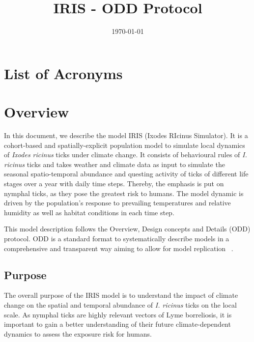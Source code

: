 \documentclass[a4paper, 11pt]{scrartcl}
\title{IRIS - ODD Protocol}
\author{}
\date{\today}
\begin{document}
\maketitle
\tableofcontents

\newpage
\listoffigures
\listoftables

\section*{List of Acronyms}
\begin{acronym}
\end{acronym}


\newpage
\section{Overview}
In this document, we describe the model IRIS (Ixodes RIcinus Simulator). It is a cohort-based and spatially-explicit population model to simulate local dynamics of \textit{Ixodes ricinus} ticks under climate change. It consists of behavioural rules of \textit{I. ricinus} ticks and takes weather and climate data as input to simulate the seasonal spatio-temporal abundance and questing activity of ticks of different life stages over a year with daily time steps. Thereby, the emphasis is put on nymphal ticks, as they pose the greatest risk to humans. The model dynamic is driven by the population's response to prevailing temperatures and relative humidity as well as habitat conditions in each time step.

This model description follows the Overview, Design concepts and Details (ODD) protocol. ODD is a standard format to systematically describe models in a comprehensive and transparent way aiming to allow for model replication ~\parencite{Grimm.2010, Grimm.2020}.


\subsection{Purpose}
The overall purpose of the IRIS model is to understand the impact of climate change on the spatial and temporal abundance of \textit{I. ricinus} ticks on the local scale. As nymphal ticks are highly relevant vectors of Lyme borreliosis, it is important to gain a better understanding of their future climate-dependent dynamics to assess the exposure risk for humans. 
\end{document}
